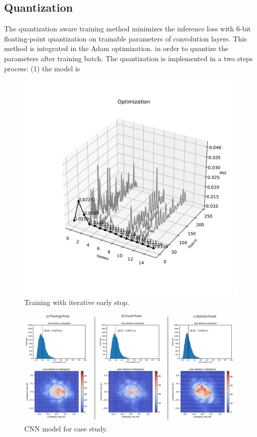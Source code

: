 \subsection{Quantization}
The quantization aware training method minimizes the inference loss with 6-bit floating-point quantization on trainable parameters of convolution layers. This method is integrated in the Adam optimization.  in order to quantize the parameters after training batch. The quantization is implemented in a two steps process: (1) the model is 
\begin{figure}[h!]
	\centering
	\includegraphics[width=\columnwidth]{../figures/histograms/optimization_E4M1.pdf}
	\caption{Training with iterative early stop.}
	\label{fig:optimization_E4M1}
\end{figure}

\begin{figure}[t!]
	\centering
	\includegraphics[width=\textwidth]{../figures/histograms/model_evaluation.pdf}
	\caption{CNN model for case study.}
	\label{fig:model_evaluation}
\end{figure}

